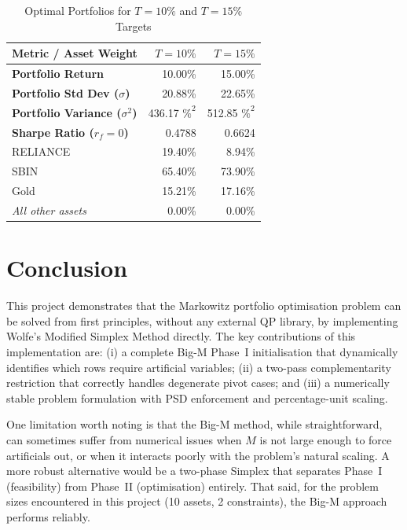 \documentclass[conference]{IEEEtran}
\begin{document}
\begin{table}[h]
    \centering
    \caption{Optimal Portfolios for $T=10\%$ and $T=15\%$ Targets}
    \label{tab:portfolios}
    \begin{tabular}{lrr}
        \toprule
        \textbf{Metric / Asset Weight} & \textbf{$T = 10\%$} & \textbf{$T = 15\%$} \\
        \midrule
        \textbf{Portfolio Return} & 10.00\% & 15.00\% \\
        \textbf{Portfolio Std Dev ($\sigma$)} & 20.88\% & 22.65\% \\
        \textbf{Portfolio Variance ($\sigma^2$)} & 436.17 $\%^2$ & 512.85 $\%^2$ \\
        \textbf{Sharpe Ratio ($r_f=0$)} & 0.4788 & 0.6624 \\
        \midrule
        RELIANCE & 19.40\% & 8.94\% \\
        SBIN & 65.40\% & 73.90\% \\
        Gold & 15.21\% & 17.16\% \\
        \textit{All other assets} & 0.00\% & 0.00\% \\
        \bottomrule
    \end{tabular}
\end{table}

\section{Conclusion}

This project demonstrates that the Markowitz portfolio optimisation problem
can be solved from first principles, without any external QP library, by
implementing Wolfe's Modified Simplex Method directly. The key contributions
of this implementation are: (i) a complete Big-M Phase~I initialisation that
dynamically identifies which rows require artificial variables; (ii) a
two-pass complementarity restriction that correctly handles degenerate pivot
cases; and (iii) a numerically stable problem formulation with PSD enforcement
and percentage-unit scaling.

One limitation worth noting is that the Big-M method, while straightforward,
can sometimes suffer from numerical issues when $M$ is not large enough to
force artificials out, or when it interacts poorly with the problem's natural
scaling. A more robust alternative would be a two-phase Simplex that separates
Phase~I (feasibility) from Phase~II (optimisation) entirely. That said, for
the problem sizes encountered in this project (10 assets, 2 constraints), the
Big-M approach performs reliably.
\end{document}
